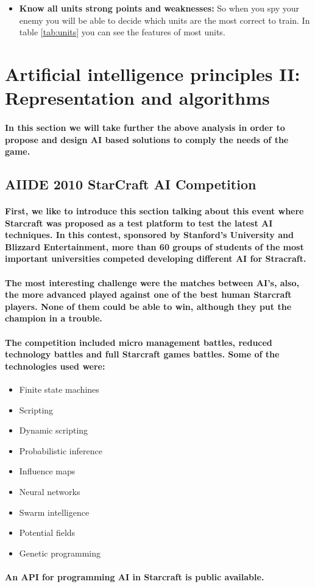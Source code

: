 \documentclass[a4paper,10pt]{article}
\newcommand{\p}[1]{\paragraph{\indent\textnormal{#1}}}
\begin{document}
     \begin{itemize}
      \item \textbf{Know all units strong points and weaknesses:} So when you spy your enemy you will be able to decide which units are the most correct to train. In table \ref{tab:units} you can see the features of most units.
     \end{itemize}


\newpage
\section{Artificial intelligence principles II: Representation and algorithms}

    \p{In this section we will take further the above analysis in order to propose and design AI based solutions to comply the needs of the game.}

    \subsection{AIIDE 2010 StarCraft AI Competition}

      \p{First, we like to introduce this section talking about this event where Starcraft was proposed as a test platform to test the latest AI techniques. In this contest, sponsored by Stanford's University and Blizzard Entertainment, more than 60 groups of students of the most important universities competed developing different AI for Stracraft.}

      \p{The most interesting challenge were the matches between AI's, also, the more advanced played against one of the best human Starcraft players. None of them could be able to win, although they put the champion in a trouble.}

      \p{The competition included micro management battles, reduced technology battles and full Starcraft games battles. Some of the technologies used were:}

      \begin{itemize}
       \item Finite state machines
       \item Scripting
       \item Dynamic scripting
       \item Probabilistic inference
       \item Influence maps
       \item Neural networks
       \item Swarm intelligence
       \item Potential fields
       \item Genetic programming
      \end{itemize}

      \p{An API for programming AI in Starcraft is public available.}
\end{document}
